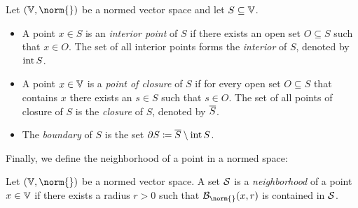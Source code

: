 \begin{definition}%
	\label{def:interior closure boundary}
	Let \( (\V, \norm{}) \) be a normed vector space and let \( S \subseteq \mathbb{V} \).
	\begin{itemize}
		\item A point \( x \in S \) is an \emph{interior point} of \( S \) if there exists an open set \( O \subseteq S \) such that \( x \in O \).
			The set of all interior points forms the \emph{interior} of \( S \), denoted by \( \operatorname{int} S \).
		\item A point \( x \in \mathbb{V} \) is a \emph{point of closure} of \( S \) if for every open set \( O \subseteq S \) that contains \( x \) there exists an \( s \in S \) such that \( s \in O \).
			The set of all points of closure of \( S \) is the \emph{closure} of \( S \), denoted by \( \overline{S} \).
		\item The \emph{boundary} of \( S \) is the set \( \partial S \coloneqq \overline{S} \setminus \operatorname{int} S \).
	\end{itemize}
\end{definition}
Finally, we define the neighborhood of a point in a normed space:
\begin{definition}[Neighborhood]%
	\label{def:neighborhood}
	Let \( (\V, \norm{}) \) be a normed vector space.
	A set \( \mathcal{S} \) is a \emph{neighborhood} of a point \( x \in \mathbb{V} \) if there exists a radius \( r > \num{0} \) such that \( \Ball{\norm{}}{x}{r} \) is contained in \( \mathcal{S} \).
\end{definition}
